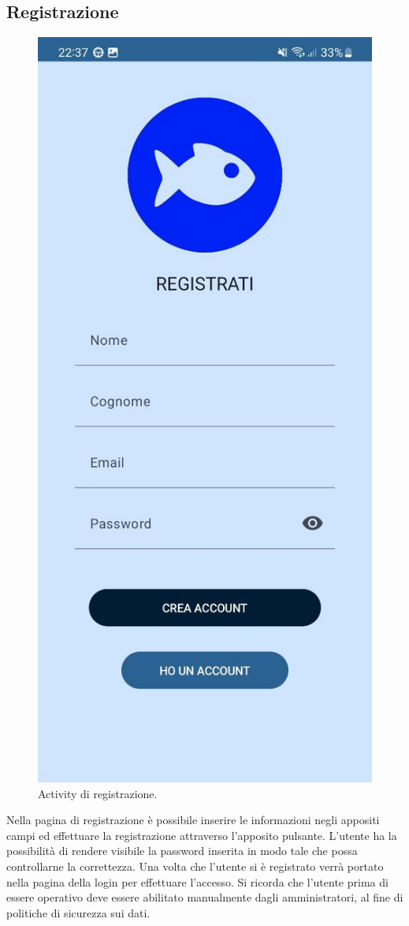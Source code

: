 \documentclass[a4paper,final,12pt]{report}
\begin{document}
\subsection{Registrazione}
\begin{figure}[hbtp]
\centering
\includegraphics[scale=0.19]{img_concettuale/regmob.jpg}
\caption{Activity di registrazione.}
\end{figure}
Nella pagina di registrazione è possibile inserire le informazioni negli appositi campi ed effettuare la registrazione attraverso l'apposito pulsante. L'utente ha la possibilità di rendere visibile la password inserita in modo tale che possa controllarne la correttezza. Una volta che l'utente si è registrato verrà portato nella pagina della login per effettuare l'accesso. Si ricorda che l'utente prima di essere operativo deve essere abilitato manualmente dagli amministratori, al fine di politiche di sicurezza sui dati.
\end{document}
